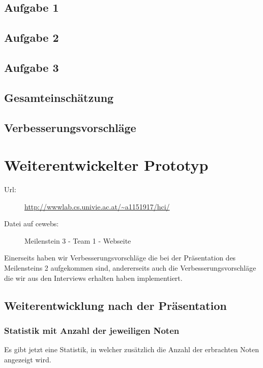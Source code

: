 \documentclass[a4paper,10pt]{scrartcl}
\begin{document}
\subsection{Aufgabe 1}

\subsection{Aufgabe 2}

\subsection{Aufgabe 3}

\subsection{Gesamteinschätzung}

\subsection{Verbesserungsvorschläge}

\section{Weiterentwickelter Prototyp}

\begin{description}
 \item[Url:] \url{http://wwwlab.cs.univie.ac.at/~a1151917/hci/}
 \item[Datei auf cewebs:]Meilenstein 3 - Team 1 - Webseite
\end{description}

Einerseits haben wir Verbesserungsvorschläge die bei der Präsentation des Meilensteins 2 aufgekommen sind, andererseits auch
die Verbesserungsvorschläge die wir aus den Interviews erhalten haben implementiert.

\subsection{Weiterentwicklung nach der Präsentation}

\subsubsection*{Statistik mit Anzahl der jeweiligen Noten}

Es gibt jetzt eine Statistik, in welcher zusätzlich die Anzahl der erbrachten Noten angezeigt wird.
\end{document}
